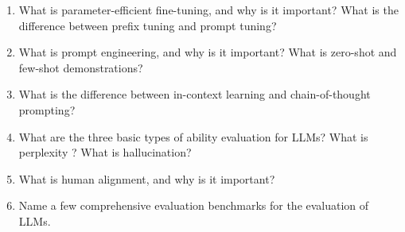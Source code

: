 \begin{enumerate}
\item What is parameter-efficient fine-tuning, and why is it important? What is the difference between prefix tuning and prompt tuning?
\item What is prompt engineering, and why is it important? What is zero-shot and few-shot demonstrations?
\item What is the difference between in-context learning and chain-of-thought prompting?
\item What are the three basic types of ability evaluation for LLMs? What is perplexity \cite{perplexity}? What is hallucination?
\item What is human alignment, and why is it important?
\item Name a few comprehensive evaluation benchmarks for the evaluation of LLMs.
\end{enumerate}


